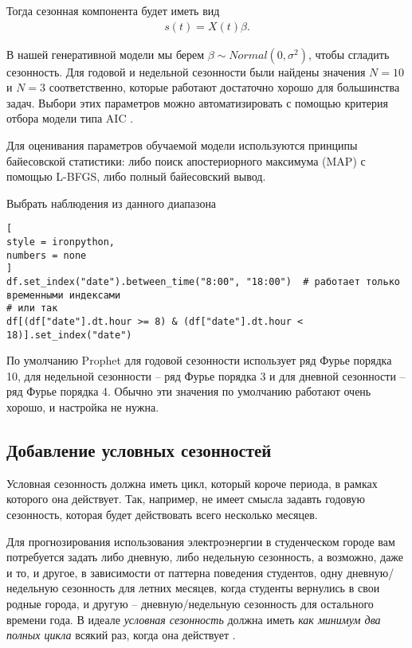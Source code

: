 \documentclass[%
	11pt,
	a4paper,
	utf8,
		]{article}
\begin{document}
Тогда сезонная компонента будет иметь вид
\begin{align*}
s(t) = X(t) \beta.
\end{align*}

В нашей генеративной модели мы берем $\beta \sim Normal(0, \sigma^2)$, чтобы сгладить сезонность. Для годовой и недельной сезонности были найдены значения $N = 10$ и $N = 3$ соответственно, которые работают достаточно хорошо для большинства задач. Выбори этих параметров можно автоматизировать с помощью критерия отбора модели типа AIC \cite[]{gruzdev:time-series-2022}.

Для оценивания параметров обучаемой модели используются принципы байесовской статистики: либо поиск апостериорного максимума (MAP) с помощью L-BFGS, либо полный байесовский вывод. 

Выбрать наблюдения из данного диапазона
\begin{lstlisting}[
style = ironpython,
numbers = none
]
df.set_index("date").between_time("8:00", "18:00")  # работает только временными индексами
# или так
df[(df["date"].dt.hour >= 8) & (df["date"].dt.hour < 18)].set_index("date")
\end{lstlisting}

По умолчанию Prophet для годовой сезонности использует ряд Фурье порядка 10, для недельной сезонности -- ряд Фурье порядка 3 и для дневной сезонности -- ряд Фурье порядка 4. Обычно эти значения по умолчанию работают очень хорошо, и настройка не нужна.

\subsection{Добавление условных сезонностей}

Условная сезонность должна иметь цикл, который короче периода, в рамках которого она действует. Так, например, не имеет смысла задавть годовую сезонность, которая будет действовать всего несколько месяцев. 

Для прогнозирования использования электроэнергии в студенческом городе вам потребуется задать либо дневную, либо недельную сезонность, а возможно, даже и то, и другое, в зависимости от паттерна поведения студентов, одну дневную/недельную сезонность для летних месяцев, когда студенты вернулись в свои родные города, и другую -- дневную/недельную сезонность для остального времени года. В идеале \emph{условная сезонность} должна иметь \emph{как минимум два полных цикла} всякий раз, когда она действует \cite[]{gruzdev:time-series-2022}.
\end{document}
